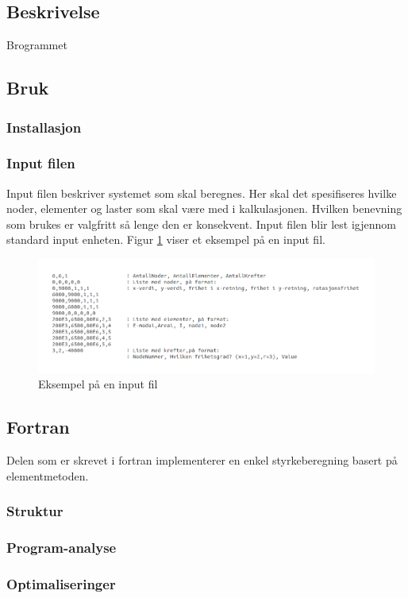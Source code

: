 \documentclass[10pt,a4paper, norsk]{article}
\begin{document}
\subsection{Beskrivelse} 
Brogrammet
\subsection{Bruk}
\subsubsection{Installasjon }
\subsubsection{Input filen}
Input filen beskriver systemet som skal beregnes. Her skal det spesifiseres hvilke noder, elementer og laster som skal være med i kalkulasjonen. Hvilken benevning som brukes er valgfritt så lenge den er konsekvent. Input filen blir lest igjennom standard input enheten. Figur \ref{fig:input} viser et eksempel på en input fil.

\begin{figure}\label{fig:input}
\centering
\includegraphics[scale=0.5]{input.png} 
\caption{Eksempel på en input fil}
\end{figure}


\subsection{Fortran}
Delen som er skrevet i fortran implementerer en enkel styrkeberegning basert på elementmetoden. 



\subsubsection{Struktur}
\subsubsection{Program-analyse}
\subsubsection{Optimaliseringer}
\end{document}
